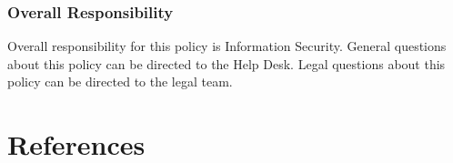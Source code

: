 \documentclass[stu]{apa7}
\begin{document}
\subsubsection{Overall Responsibility}
\label{sec:org6f55868}

Overall responsibility for this policy is Information Security. General questions about this policy can be directed to the Help Desk. Legal questions about this policy can be directed to the legal team.


\newpage


\section*{References}
\label{sec:org6502000}
\printbibliography[heading=none]
\end{document}

